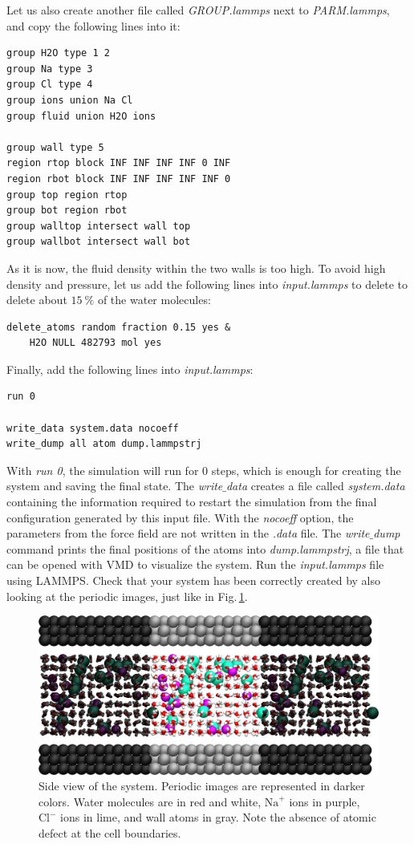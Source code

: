 \documentclass[9pt,tutorial]{livecoms}
\begin{document}
Let us also create another file called \textit{GROUP.lammps} next to \textit{PARM.lammps}, and copy the following lines into it:
{\normalsize \begin{verbatim}
group H2O type 1 2
group Na type 3
group Cl type 4
group ions union Na Cl
group fluid union H2O ions

group wall type 5
region rtop block INF INF INF INF 0 INF
region rbot block INF INF INF INF INF 0
group top region rtop
group bot region rbot
group walltop intersect wall top
group wallbot intersect wall bot
\end{verbatim}}
As it is now, the fluid density within the two walls is too high. To avoid high density and pressure, let us add the following lines into \textit{input.lammps} to delete to delete about $15~\%$ of the water molecules:
{\normalsize \begin{verbatim}
delete_atoms random fraction 0.15 yes &
    H2O NULL 482793 mol yes
\end{verbatim}}
Finally, add the following lines into \textit{input.lammps}:
{\normalsize \begin{verbatim}
run 0

write_data system.data nocoeff
write_dump all atom dump.lammpstrj
\end{verbatim}}
With \textit{run 0}, the simulation will run for 0 steps, which is enough for creating the system and saving the final state. The \textit{write$\_$data} creates a file called \textit{system.data} containing the information required to restart the
simulation from the final configuration generated by this input file. With the \textit{nocoeff} option, the parameters from the force field are not written in the \textit{.data} file. The \textit{write$\_$dump} command prints the final
positions of the atoms into \textit{dump.lammpstrj}, a file that can be opened with VMD to visualize the system. Run the \textit{input.lammps} file using LAMMPS. Check that your system has been correctly created by also looking at the periodic images, just like in Fig.\,\ref{fig:NANOSHEAR-system}.

\begin{figure}
\centering
\includegraphics[width=\linewidth]{NANOSHEAR-system}
\caption{Side view of the system. Periodic images are represented in darker colors. Water molecules are in red and white, $\text{Na}^+$ ions in purple, $\text{Cl}^-$ ions in lime, and wall atoms in gray. Note the absence of atomic defect at the cell boundaries.}
\label{fig:NANOSHEAR-system}
\end{figure}
\end{document}
